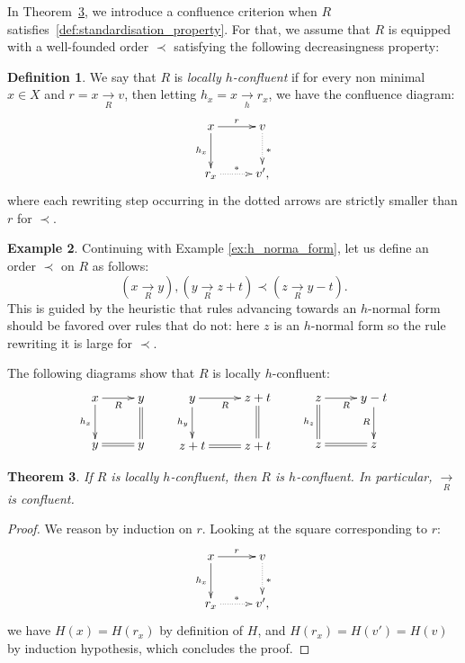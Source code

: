 \documentclass[10pt]{easychair}
\newtheorem{theorem}{Theorem}[section]
\theoremstyle{definition}
\newtheorem{definition}[theorem]{Definition}
\newtheorem{example}[theorem]{Example}
\newcommand\rewR{\underset{R}{\longrightarrow}}
\newcommand\rewh{\underset{h}{\longrightarrow}}
\begin{document}
In Theorem~\ref{thm:confluence_criterion}, we introduce a confluence
criterion when $R$ satisfies~\ref{def:standardisation_property}. For
that, we assume that $R$ is equipped with a well-founded order $\prec$
satisfying the following decreasingness property:

\begin{definition}\label{proper:decreasingness_property}
  We say that $R$ is \emph{locally $h$-confluent} if for every non
  minimal $x\in X$ and $r=x\rewR v$, then letting $h_x=x\rewh r_x$, we
  have the confluence diagram:
  \[
    \xymatrix @C = 2.5em @R = 2.5em{
    x 
    \ar [r] ^{r}
    \ar[d] _{h_x}
     &
      v
      \ar@{.>} [d] ^{*}
      \\
      r_x
      \ar@{.>} [r] ^{*}
      & 
      v',
    }
  \]
  where each rewriting step occurring in the dotted arrows are strictly
  smaller than $r$ for $\prec$.
\end{definition}

\begin{example}
Continuing with Example \ref{ex:h_norma_form}, let us define an order $\prec$ on $R$ as follows:
\[
(x \rewR y), (y \rewR z + t) \prec (z \rewR y - t).
\]
This is guided by the heuristic that rules advancing towards an $h$-normal form should be favored over rules that do not: here $z$ is an $h$-normal form so the rule rewriting it is large for $\prec$.

The following diagrams show that $R$ is locally $h$-confluent:
\[
   \xymatrix @C = 2.5em @R = 2.5em{
   x \ar [r] _{R}  
    \ar [d] _{h_x}   
   & y 
   \ar@{=} [d]
   \\
    y
    \ar@{=} [r]
    & y
    }
    \qquad
   \xymatrix @C = 2.5em @R = 2.5em{
   y \ar [r] _{R}  
    \ar [d] _{h_y}   
   & z + t
   \ar@{=} [d]
   \\
    z + t
    \ar@{=} [r]
    & z + t
    }
     \qquad
   \xymatrix @C = 2.5em @R = 2.5em{
   z \ar [r] _{R}  
    \ar@{=} [d] _{h_z}   
   & y - t
   \ar [d] _{R}
   \\
    z
    \ar@{=} [r]
    & z
    }
\]    
\end{example}


\begin{theorem}\label{thm:confluence_criterion}
  If $R$ is locally $h$-confluent, then $R$ is $h$-confluent. In particular, $\rewR$ is confluent.
\end{theorem}

\begin{proof}
 We reason by induction on $r$. Looking at the square corresponding to $r$:
  \[
    \xymatrix @C = 2.5em @R = 2.5em{
    x 
    \ar [r] ^{r}
    \ar[d] _{h_x}
     &
      v
      \ar@{.>} [d] ^{*}
      \\
      r_x
      \ar@{.>} [r] ^{*}
      & 
      v',
    }
  \]
 we have $H(x) = H(r_x)$ by definition of $H$, and $H(r_x) = H(v') = H(v)$ by induction hypothesis, which concludes the proof.
\end{proof}
\medskip
\end{document}
